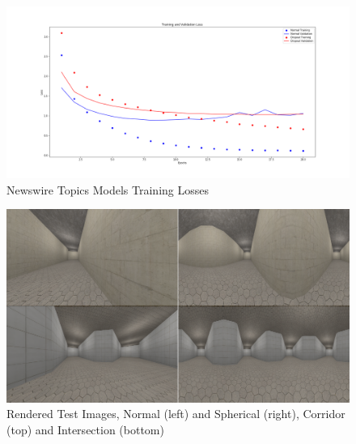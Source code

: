 \documentclass[sigconf]{acmart}
\begin{document}
\begin{figure}[h]
  \centering
  \includegraphics[width=\linewidth]{classifyNewswireTopics_Loss}
  \caption{Newswire Topics Models Training Losses}
  \label{fig:NewswireLoss}
\end{figure}

\begin{figure}[h]
  \centering
  \includegraphics[width=\linewidth]{Blender_NormalPanoComparison}
  \caption{Rendered Test Images, Normal (left) and Spherical (right), Corridor (top) and Intersection (bottom)}
  \label{fig:RenderSample}
\end{figure}
\end{document}
